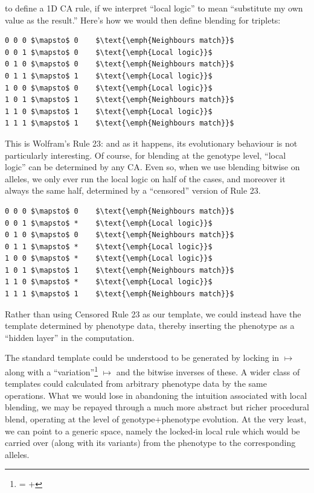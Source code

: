 \documentclass{AISB2008}
\makeatletter
\renewcommand{\boxed}[1]{\text{\fboxsep=.2em\fbox{\m@th$\displaystyle#1$}}}
\newcommand{\mystrut}{\vphantom{b\gamma}}
\makeatother
\begin{document}
\noindent to define a 1D CA rule, if we interpret ``local logic'' to
mean ``substitute my own value as the result.''  Here's how we would
then define blending for triplets:

\lstset{
  xleftmargin=.2\columnwidth, xrightmargin=.01\columnwidth
}

\begin{lstlisting}[mathescape]
0 0 0 $\mapsto$ 0    $\text{\emph{Neighbours match}}$
0 0 1 $\mapsto$ 0    $\text{\emph{Local logic}}$
0 1 0 $\mapsto$ 0    $\text{\emph{Neighbours match}}$
0 1 1 $\mapsto$ 1    $\text{\emph{Local logic}}$
1 0 0 $\mapsto$ 0    $\text{\emph{Local logic}}$
1 0 1 $\mapsto$ 1    $\text{\emph{Neighbours match}}$
1 1 0 $\mapsto$ 1    $\text{\emph{Local logic}}$
1 1 1 $\mapsto$ 1    $\text{\emph{Neighbours match}}$
\end{lstlisting}

This is Wolfram's Rule 23: and as it happens, its evolutionary
behaviour is not particularly interesting.  Of course, for blending at
the genotype level, ``local logic'' can be determined by any CA.  Even
so, when we use blending bitwise on alleles, we only ever run the
local logic on half of the cases, and moreover it always the same
half, determined by a ``censored'' version of Rule 23.

\begin{lstlisting}[mathescape]
0 0 0 $\mapsto$ 0    $\text{\emph{Neighbours match}}$
0 0 1 $\mapsto$ *    $\text{\emph{Local logic}}$
0 1 0 $\mapsto$ 0    $\text{\emph{Neighbours match}}$
0 1 1 $\mapsto$ *    $\text{\emph{Local logic}}$
1 0 0 $\mapsto$ *    $\text{\emph{Local logic}}$
1 0 1 $\mapsto$ 1    $\text{\emph{Neighbours match}}$
1 1 0 $\mapsto$ *    $\text{\emph{Local logic}}$
1 1 1 $\mapsto$ 1    $\text{\emph{Neighbours match}}$
\end{lstlisting}

Rather than using Censored Rule 23 as our template, we could instead
have the template determined by phenotype data, thereby inserting the
phenotype as a ``hidden layer'' in the computation.

The standard template could be understood to be generated by locking in
%
\boxed{0\mystrut}\boxed{0\mystrut}\boxed{0\mystrut} $\mapsto$ \boxed{0\mystrut}
%
along with a ``variation''\footnote{%
%
\boxed{0\mystrut}\boxed{1\mystrut}\boxed{0\mystrut} =
%
\boxed{0\mystrut}\boxed{0\mystrut}\boxed{0\mystrut} +
%
\boxed{\:\:\:\mystrut}\boxed{1\mystrut}\boxed{\:\:\:\mystrut}}
\boxed{0\mystrut}\boxed{1\mystrut}\boxed{0\mystrut} $\mapsto$
\boxed{0\mystrut} and the bitwise inverses of these.  A wider class of
templates could calculated from arbitrary phenotype data by the same
operations.  What we would lose in abandoning the intuition associated
with local blending, we may be repayed through a much more abstract
but richer procedural blend, operating at the level of
genotype+phenotype evolution.  At the very least, we can point to a
generic space, namely the locked-in local rule which would be carried
over (along with its variants) from the phenotype to the corresponding
alleles.
\end{document}
